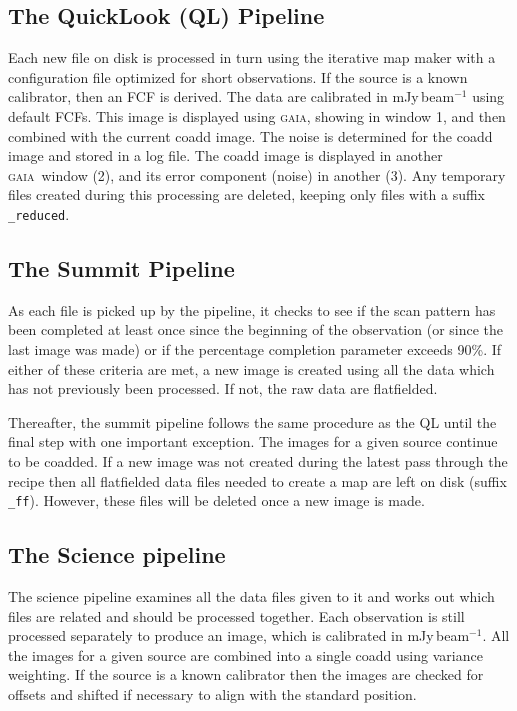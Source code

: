 \documentclass[twoside,11pt]{article}
\renewcommand{\_}{\texttt{\symbol{95}}}
\newcommand{\GAIA}{\textsc{gaia}}
\begin{document}
\subsection{The QuickLook (QL) Pipeline}

Each new file on disk is processed in turn using the iterative map
maker with a configuration file optimized for short observations. If
the source is a known calibrator, then an FCF is derived. The data are
calibrated in mJy\,beam$^{-1}$ using default FCFs. This image is
displayed using \GAIA, showing in window 1, and then combined with the
current coadd image. The noise is determined for the coadd image and
stored in a log file. The coadd image is displayed in another
\GAIA\ window (2), and its error component (noise) in another (3). Any
temporary files created during this processing are deleted, keeping
only files with a suffix \verb+_reduced+.

\subsection{The Summit Pipeline}

As each file is picked up by the pipeline, it checks to see if the
scan pattern has been completed at least once since the beginning of
the observation (or since the last image was made) or if the
percentage completion parameter exceeds 90\%. If either of these
criteria are met, a new image is created using all the data which has
not previously been processed. If not, the raw data are flatfielded.

Thereafter, the summit pipeline follows the same procedure as the QL
until the final step with one important exception. The images for a
given source continue to be coadded. If a new image was not created
during the latest pass through the recipe then all flatfielded data
files needed to create a map are left on disk (suffix
\verb+_ff+). However, these files will be deleted once a new image is
made.

\subsection{The Science pipeline}

The science pipeline examines all the data files given to it and works
out which files are related and should be processed together. Each
observation is still processed separately to produce an image, which
is calibrated in mJy\,beam$^{-1}$. All the images for a given source are
combined into a single coadd using variance weighting. If the source
is a known calibrator then the images are checked for offsets and
shifted if necessary to align with the standard position.
\end{document}
